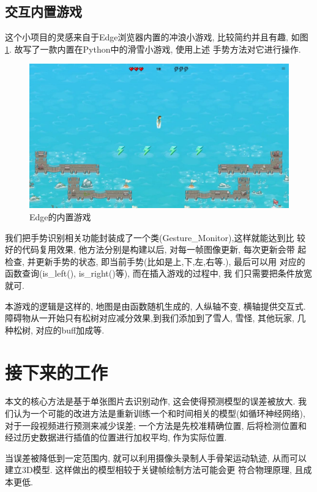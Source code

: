 \documentclass[lang=cn,11pt,a4paper]{elegantpaper}
\begin{document}
\subsection{交互内置游戏}

这个小项目的灵感来自于Edge浏览器内置的冲浪小游戏, 
比较简约并且有趣, 如图\ref{edge}. 故写了一款内置在Python中的滑雪小游戏, 使用上述
手势方法对它进行操作. 
\begin{figure}[htb]
  \centering
  \includegraphics[width=.8\textwidth]{imgs/edge.jpeg}
  \caption{Edge的内置游戏\label{edge}}
\end{figure}

我们把手势识别相关功能封装成了一个类(Gesture\_Monitor),这样就能达到比
较好的代码复用效果, 他方法分别是构建以后, 对每一帧图像更新, 每次更新会带
起检查, 并更新手势的状态, 即当前手势(比如是上,下,左,右等.), 最后可以用
对应的函数查询(is\_left(), is\_right()等), 而在插入游戏的过程中, 我
们只需要把条件放宽就可.
 
本游戏的逻辑是这样的, 地图是由函数随机生成的, 人纵轴不变, 横轴提供交互式. 
障碍物从一开始只有松树对应减分效果,到我们添加到了雪人, 雪怪, 其他玩家, 
几种松树, 对应的buff加成等. 



\section{接下来的工作}

本文的核心方法是基于单张图片去识别动作, 这会使得预测模型的误差被放大. 
我们认为一个可能的改进方法是重新训练一个和时间相关的模型(如循环神经网络), 
对于一段视频进行预测来减少误差; 一个方法是先校准精确位置, 后将检测位置和
经过历史数据进行插值的位置进行加权平均, 作为实际位置. 

当误差被降低到一定范围内, 就可以利用摄像头录制人手骨架运动轨迹, 
从而可以建立3D模型. 这样做出的模型相较于关键帧绘制方法可能会更
符合物理原理, 且成本更低. 
\end{document}
